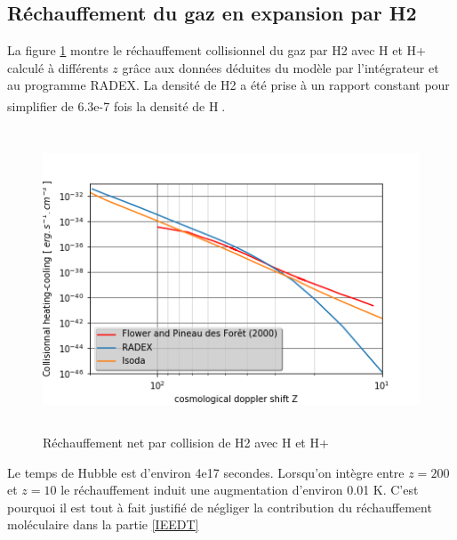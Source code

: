 \documentclass[10pt, a4paper]{report}
\numberwithin{equation}{subsection}
\begin{document}
\subsection{Réchauffement du gaz en expansion par H2}
La figure \ref{fig:ZCOOL1} montre le réchauffement collisionnel du gaz par H2 avec H et H+ calculé à différents $z$ grâce aux données déduites du modèle par l'intégrateur et au programme RADEX. La densité de H2 a été prise à un rapport constant pour simplifier de 6.3e-7 fois la densité de H\textsuperscript{\cite{Galli} \cite{Flower}}.   
\begin{figure}[]
\centering
\includegraphics[width=14.0cm,height=9cm]{Zcoolfinal.png}
\caption{Réchauffement net par collision de H2 avec H et H+}
\label{fig:ZCOOL1}
\end{figure}

Le temps de Hubble est d'environ 4e17 secondes. Lorsqu'on intègre entre $z=200$ et $z=10$ le réchauffement induit une augmentation d'environ 0.01 K. C'est pourquoi il est tout à fait justifié de négliger la contribution du réchauffement moléculaire dans la partie \ref{IEEDT}
\end{document}
